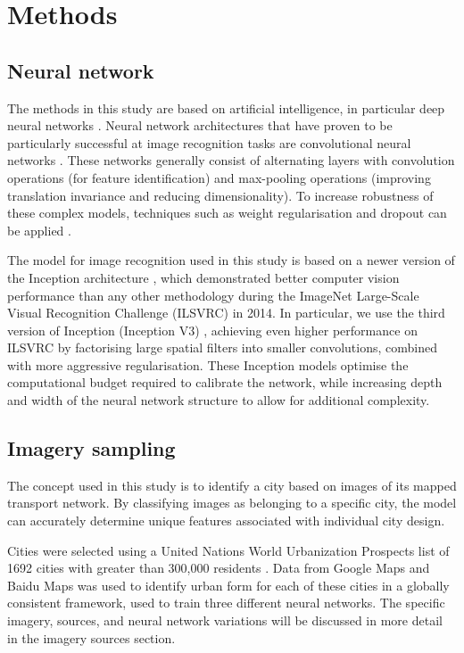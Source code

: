 \documentclass[sageh,times]{sagej}
\begin{document}
\section{Methods}\label{sec:methods}

\subsection{Neural network}\label{sec:methods1}


The methods in this study are based on artificial intelligence, in particular deep neural networks \citep{Bishop1995,Samarasinghe2016,Graupe2013}. Neural network architectures that have proven to be particularly successful at image recognition tasks are convolutional neural networks \citep{Schmidhuber2015}. These networks generally consist of alternating layers with convolution operations (for feature identification) and max-pooling operations (improving translation invariance and reducing dimensionality). To increase robustness of these complex models, techniques such as weight regularisation and dropout can be applied \citep{Srivastava2014}.

The model for image recognition used in this study is based on a newer version of the Inception architecture \citep{Szegedy2015}, which demonstrated better computer vision performance than any other methodology during the ImageNet Large-Scale Visual Recognition Challenge (ILSVRC) \citep{Russakovsky2015} in 2014. In particular, we use the third version of Inception (Inception V3) \citep{Szegedy2015a}, achieving even higher performance on ILSVRC by factorising large spatial filters into smaller convolutions, combined with more aggressive regularisation. These Inception models optimise the computational budget required to calibrate the network, while increasing depth and width of the neural network structure to allow for additional complexity.

\subsection{Imagery sampling}\label{sec:methods2}

The concept used in this study is to identify a city based on images of its mapped transport network. By classifying images as belonging to a specific city, the model can accurately determine unique features associated with individual city design. 

Cities were selected using a United Nations World Urbanization Prospects list of 1692 cities with greater than 300,000 residents \citep{UN2014}. Data from Google Maps and Baidu Maps was used to identify urban form for each of these cities in a globally consistent framework, used to train three different neural networks. The specific imagery, sources, and neural network variations will be discussed in more detail in the imagery sources section.
\end{document}
